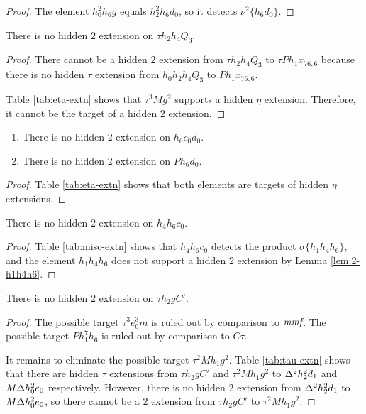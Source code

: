 \begin{proof}
The element $h_0^2 h_6 g$ equals
$h_2^2 h_6 d_0$, so it detects $\nu^2 \{h_6 d_0\}$.
\end{proof}

\begin{lemma}
\label{lem:2-th2h4Q3}
There is no hidden $2$ extension on $\tau h_2 h_4 Q_3$.
\end{lemma}

\begin{proof}
There cannot be a hidden $2$ extension from $\tau h_2 h_4 Q_3$
to $\tau P h_1 x_{76,6}$ because there is no hidden
$\tau$ extension from $h_0 h_2 h_4 Q_3$ to $P h_1 x_{76,6}$.

Table \ref{tab:eta-extn} shows that 
$\tau^3 M g^2$ supports a hidden $\eta$ extension.  Therefore, it
cannot be the target of a hidden $2$ extension.
\end{proof}

\begin{lemma}
\label{lem:2-h6hc0d0}
\mbox{}
\begin{enumerate}
\item
{}
There is no hidden $2$ extension on $h_6 c_0 d_0$.
\item
{}
There is no hidden $2$ extension on $P h_6 d_0$.
\end{enumerate}
\end{lemma}

\begin{proof}
Table \ref{tab:eta-extn} shows that both elements
are targets of hidden $\eta$ extensions.
\end{proof}

\begin{lemma}
\label{lem:2-h4h6c0}
There is no hidden $2$ extension on $h_4 h_6 c_0$.
\end{lemma}

\begin{proof}
Table \ref{tab:misc-extn} shows that
$h_4 h_6 c_0$ detects the product $\sigma \{h_1 h_4 h_6\}$,
and the element $h_1 h_4 h_6$ does not support a hidden $2$ extension
by Lemma \ref{lem:2-h1h4h6}.
\end{proof}

\begin{lemma}
\label{lem:2-th2gC'}
There is no hidden $2$ extension on $\tau h_2 g C'$.
\end{lemma}

\begin{proof}
The possible target $\tau^3 e_0^3 m$ is ruled out by comparison
to $\textit{mmf}$.  The possible target $P h_1^7 h_6$ is ruled out by 
comparison to $C\tau$.

It remains to eliminate the possible target $\tau^2 M h_1 g^2$.
Table \ref{tab:tau-extn} shows that there are hidden $\tau$
extensions from
$\tau h_2 g C'$ and $\tau^2 M h_1 g^2$ to
$\Delta^2 h_2^2 d_1$ and $M \Delta h_0^2 e_0$ respectively.
However, there is no hidden $2$ extension from
$\Delta^2 h_2^2 d_1$ to $M \Delta h_0^2 e_0$, so there cannot be a
$2$ extension from $\tau h_2 g C'$ to $\tau^2 M h_1 g^2$.
\end{proof}

